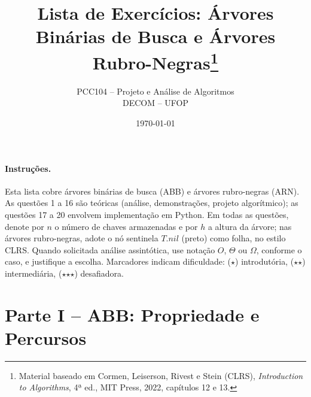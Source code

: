 \documentclass[10pt,a4paper]{extarticle}
\title{Lista de Exercícios: Árvores Binárias de Busca e Árvores Rubro-Negras\footnote{Material baseado em Cormen, Leiserson, Rivest e Stein (CLRS), \emph{Introduction to Algorithms}, 4ª ed., MIT Press, 2022, capítulos 12 e 13.}}
\author{PCC104 -- Projeto e Análise de Algoritmos \\ DECOM -- UFOP}
\date{\today}
\newcommand{\impt}[1]{\textcolor{important}{#1}}
\newcommand{\ntc}[1]{\textcolor{notice}{#1}}
\begin{document}
\maketitle

\paragraph{Instruções.} Esta lista cobre \impt{árvores binárias de busca (ABB)} e \impt{árvores rubro-negras (ARN)}. As questões 1 a 16 são teóricas (análise, demonstrações, projeto algorítmico); as questões 17 a 20 envolvem implementação em Python. Em todas as questões, denote por $n$ o número de chaves armazenadas e por $h$ a altura da árvore; nas árvores rubro-negras, adote o nó sentinela $T.\textit{nil}$ (preto) como folha, no estilo CLRS. Quando solicitada análise assintótica, use notação $O$, $\Theta$ ou $\Omega$, conforme o caso, e justifique a escolha. Marcadores indicam dificuldade: \ntc{($\star$)} introdutória, \ntc{($\star$$\star$)} intermediária, \ntc{($\star$$\star$$\star$)} desafiadora.

\vspace{0.4cm}

\section*{Parte I -- ABB: Propriedade e Percursos}
\end{document}
